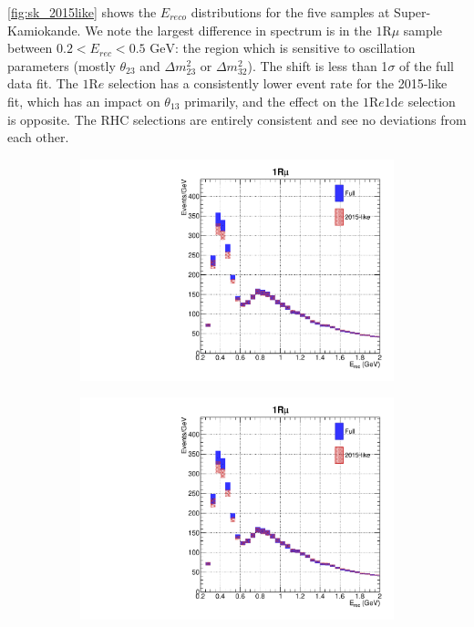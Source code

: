 \autoref{fig:sk_2015like} shows the $E_{reco}$ distributions for the five samples at Super-Kamiokande. We note the largest difference in spectrum is in the $1\text{R}\mu$ sample between $0.2 < E_{rec} < 0.5\text{ GeV}$: the region which is sensitive to oscillation parameters (mostly $\theta_{23}$ and $\Delta m^2_{23}$ or $\Delta m^2_{32}$). The shift is less than 1$\sigma$ of the full data fit. The $1\text{R}e$ selection has a consistently lower event rate for the 2015-like fit, which has an impact on $\theta_{13}$ primarily, and the effect on the $1\text{R}e1\text{d}e$ selection is opposite. The RHC selections are entirely consistent and see no deviations from each other.
\begin{figure}[h]
	\begin{subfigure}[t]{0.32\textwidth}
		\includegraphics[width=\textwidth, trim={0mm 0mm 0mm 0mm}, clip, page=1]{figures/mach3/data/alt/try_2017_fit_on_sk_spectra_posterior_sk_error_2015like_spectra}
	\end{subfigure}
	\begin{subfigure}[t]{0.32\textwidth}
		\includegraphics[width=\textwidth, trim={0mm 0mm 0mm 0mm}, clip, page=2]{figures/mach3/data/alt/try_2017_fit_on_sk_spectra_posterior_sk_error_2015like_spectra}

\end{subfigure}
\end{figure}
